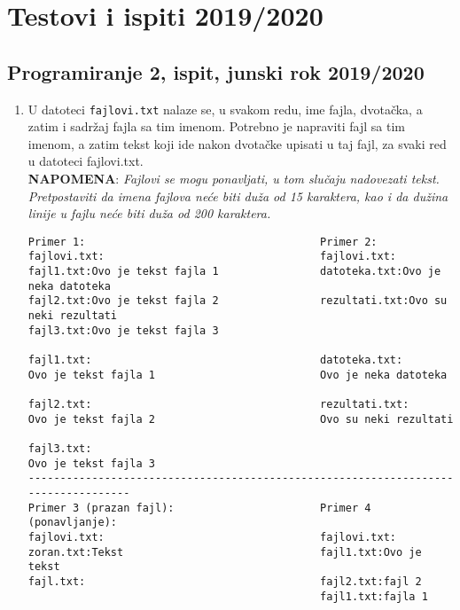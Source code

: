 \chapter{Testovi i ispiti 2019/2020}

\section{Programiranje 2, ispit, junski rok 2019/2020}

\begin{enumerate}

\item U datoteci \texttt{fajlovi.txt} nalaze se, u svakom redu, ime fajla, dvotačka, a zatim i sadržaj fajla sa tim imenom. Potrebno je napraviti fajl sa tim imenom, a zatim tekst koji ide nakon dvotačke upisati u taj fajl, za svaki red u datoteci fajlovi.txt. \\
\textbf{NAPOMENA}: \textit{Fajlovi se mogu ponavljati, u tom slučaju nadovezati tekst. Pretpostaviti da imena fajlova neće biti duža od 15 karaktera, kao i da dužina linije u fajlu neće biti duža od 200 karaktera. }
\begin{verbatim}
Primer 1:                                     Primer 2:                               
fajlovi.txt:                                  fajlovi.txt:
fajl1.txt:Ovo je tekst fajla 1                datoteka.txt:Ovo je neka datoteka           
fajl2.txt:Ovo je tekst fajla 2                rezultati.txt:Ovo su neki rezultati
fajl3.txt:Ovo je tekst fajla 3 
   
fajl1.txt:                                    datoteka.txt:
Ovo je tekst fajla 1                          Ovo je neka datoteka

fajl2.txt:                                    rezultati.txt:
Ovo je tekst fajla 2                          Ovo su neki rezultati

fajl3.txt:
Ovo je tekst fajla 3
-----------------------------------------------------------------------------------
Primer 3 (prazan fajl):                       Primer 4 (ponavljanje):
fajlovi.txt:                                  fajlovi.txt:
zoran.txt:Tekst                               fajl1.txt:Ovo je tekst
fajl.txt:                                     fajl2.txt:fajl 2
                                              fajl1.txt:fajla 1  
                                              

\end{verbatim}
\end{enumerate}
